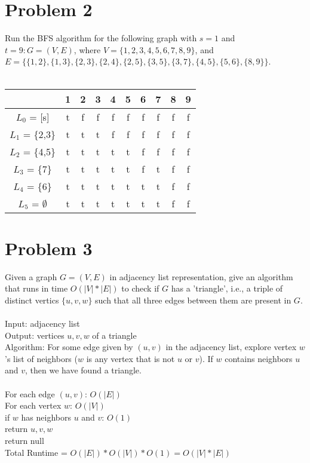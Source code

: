 \documentclass[11pt,letterpaper]{article}
\newcommand\tab[1][1cm]{\hspace*{#1}}
\begin{document}
\section{Problem 2}
Run the BFS algorithm for the following graph with $s=1$ and $t=9: G=(V,E)$, where $V = \{1,2,3,4,5,6,7,8,9\}$, and $E = \{\{1,2\},\{1,3\},\{2,3\},\{2,4\},\{2,5\},\{3,5\},\{3,7\},\{4,5\},\{5,6\},\{8,9\}\}$. \\\\ 
\begin{center}
\begin{tabular} { |c|c|c|c|c|c|c|c|c|c| }
\hline
& 1 & 2 & 3 & 4 & 5 & 6 & 7 & 8 & 9 \\
\hline
$L_0$ = [s] & t & f & f & f & f & f & f & f & f \\
\hline
$L_1$ = \{2,3\} & t & t & t & f & f & f & f & f & f \\
\hline
$L_2$ = \{4,5\} & t & t & t & t & t & f & f & f & f \\
\hline
$L_3$ = \{7\} & t & t & t & t & t & f & t & f & f \\
\hline
$L_4$ = \{6\} & t & t & t & t & t & t & t & f & f \\
\hline
$L_5$ = $\emptyset$ & t & t & t & t & t & t & t & f & f \\
\hline
\end{tabular}
\end{center}

\pagebreak

\section{Problem 3}
Given a graph $G=(V,E)$ in adjacency list representation, give an algorithm that runs in time $O(|V|*|E|)$ to check if $G$ has a 'triangle', i.e., a triple of distinct vertics $\{u,v,w\}$ such that all three edges between them are present in $G$. \\\\
Input: adjacency list \\
Output: vertices ${u,v,w}$ of a triangle \\
Algorithm: For some edge given by $(u,v)$ in the adjacency list, explore vertex $w$'s list of neighbors ($w$ is any vertex that is not $u$ or $v$). If $w$ contains neighbors $u$ and $v$, then we have found a triangle. \\\\
For each edge $(u,v)$: $O(|E|)$ \\
\tab For each vertex $w$: $O(|V|)$ \\ 
\tab \tab if $w$ has neighbors $u$ and $v$: $O(1)$ \\
\tab \tab \tab return ${u,v,w}$ \\
return null \\
Total Runtime = $O(|E|)*O(|V|)*O(1)=O(|V|*|E|)$ \\
\end{document}
